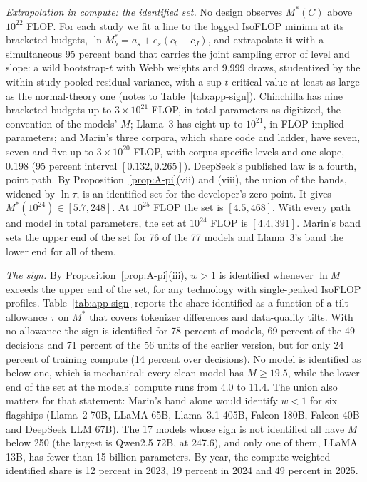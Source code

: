 \textit{Extrapolation in compute: the identified set.} No design observes $M^*(C)$ above $10^{22}$ FLOP. For each study
we fit a line to the logged IsoFLOP minima at its bracketed budgets, $\ln M^*_b=a_s+e_s(c_b-c_J)$, and extrapolate it
with a simultaneous 95 percent band that carries the joint sampling error of level and slope: a wild bootstrap-$t$ with
Webb weights and 9,999 draws, studentized by the within-study pooled residual variance, with a sup-$t$ critical value at
least as large as the normal-theory one (notes to Table~\ref{tab:app-sign}). Chinchilla has nine bracketed budgets up to
$3\times10^{21}$ FLOP, in total parameters as digitized, the convention of the models' $M$; Llama~3 has eight up to
$10^{21}$, in FLOP-implied parameters; and Marin's three corpora, which share code and ladder, have seven, seven and
five up to $3\times10^{20}$ FLOP, with corpus-specific levels and one slope, 0.198 (95 percent interval
$[0.132,0.265]$). DeepSeek's published law is a fourth, point path. By Proposition~\ref{prop:A-pi}(vii) and (viii), the
union of the bands, widened by $\ln\tau$, is an identified set for the developer's zero point. It gives
$M^*(10^{24})\in[5.7,248]$. At $10^{25}$ FLOP the set is $[4.5,468]$. With every path and model in total parameters, the
set at $10^{24}$ FLOP is $[4.4,391]$. Marin's band sets the upper end of the set for 76 of the 77 models and Llama~3's
band the lower end for all of them.

\textit{The sign.} By Proposition~\ref{prop:A-pi}(iii), $w>1$ is identified whenever $\ln M$ exceeds the upper end of the
set, for any technology with single-peaked IsoFLOP profiles. Table~\ref{tab:app-sign} reports the share identified as a
function of a tilt allowance $\tau$ on $M^*$ that covers tokenizer differences and data-quality tilts. With no allowance
the sign is identified for 78 percent of models, 69 percent of the 49 decisions and 71 percent of the 56 units of the
earlier version, but for only 24 percent of training compute (14 percent over decisions). No model is identified as below
one, which is mechanical: every clean model has $M\ge19.5$, while the lower end of the set at the models' compute runs
from 4.0 to 11.4. The union also matters for that statement: Marin's band alone would identify $w<1$ for six flagships
(Llama~2 70B, LLaMA 65B, Llama~3.1 405B, Falcon 180B, Falcon 40B and DeepSeek LLM 67B). The 17 models whose sign is not
identified all have $M$ below 250 (the largest is Qwen2.5 72B, at 247.6), and only one of them, LLaMA 13B, has fewer than
15 billion parameters. By year, the compute-weighted identified share is 12 percent in 2023, 19 percent in 2024 and 49
percent in 2025.

